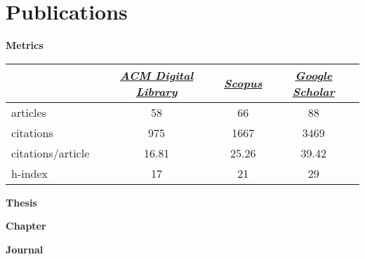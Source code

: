 \documentclass{article}
\begin{document}
 \section{Publications}\noindent\textbf{Metrics}\\
\noindent\begin{center}\begin{tabular}{lccc}
&\href{http://dl.acm.org/author\_page.cfm?id=81551748956}{\textit{ACM Digital Library}}&\href{https://www.scopus.com/authid/detail.uri?authorId=55605195900}{\textit{Scopus}}&\href{http://scholar.google.com/citations?user=212SLn0AAAAJ}{\textit{Google Scholar}}\\
\hline
articles&58&66&88\\
citations&975&1667&3469\\
citations/article&16.81&25.26&39.42\\
h-index&17&21&29
\end{tabular}
\end{center}

\vspace{\baselineskip}
\noindent\textbf{Thesis}\\
\begin{verse}
\end{verse}
\vspace{\baselineskip}
\noindent\textbf{Chapter}\\
\begin{verse}
\end{verse}
\vspace{\baselineskip}
\noindent\textbf{Journal}\\
\begin{verse}
\end{verse}
\begin{verse}
\end{verse}
\begin{verse}
\end{verse}
\begin{verse}
\end{verse}
\begin{verse}
\end{verse}
\begin{verse}
\end{verse}
\begin{verse}
\end{verse}
\begin{verse}
\end{verse}
\begin{verse}
\end{verse}
\begin{verse}
\end{verse}
\begin{verse}
\end{verse}
\end{document}

